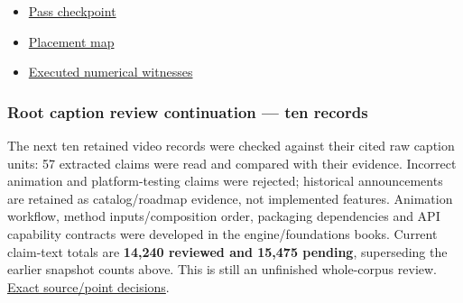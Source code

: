 \begin{itemize}
\tightlist
\item
  \href{/Users/swayamsingal/.codex/source-cache/manual-integration-2026-11-10/math-repair-2026-11-11/WORK_STATE.json}{Pass checkpoint}
\item
  \href{/Users/swayamsingal/.codex/source-cache/manual-integration-2026-11-10/math-repair-2026-11-11/placements.json}{Placement map}
\item
  \href{/Users/swayamsingal/.codex/source-cache/manual-integration-2026-11-10/math-repair-2026-11-11/numeric-witnesses.json}{Executed numerical witnesses}
\end{itemize}

\subsubsection{Root caption review continuation --- ten records}\label{root-caption-review-continuation-ten-records}

The next ten retained video records were checked against their cited raw caption units: 57 extracted claims were read and compared with their evidence. Incorrect animation and platform-testing claims were rejected; historical announcements are retained as catalog/roadmap evidence, not implemented features. Animation workflow, method inputs/composition order, packaging dependencies and API capability contracts were developed in the engine/foundations books. Current claim-text totals are \textbf{14,240 reviewed and 15,475 pending}, superseding the earlier snapshot counts above. This is still an unfinished whole-corpus review. \href{/Users/swayamsingal/.codex/source-cache/manual-integration-2026-11-10/math-repair-2026-11-11/caption-batch-01-review.json}{Exact source/point decisions}.
